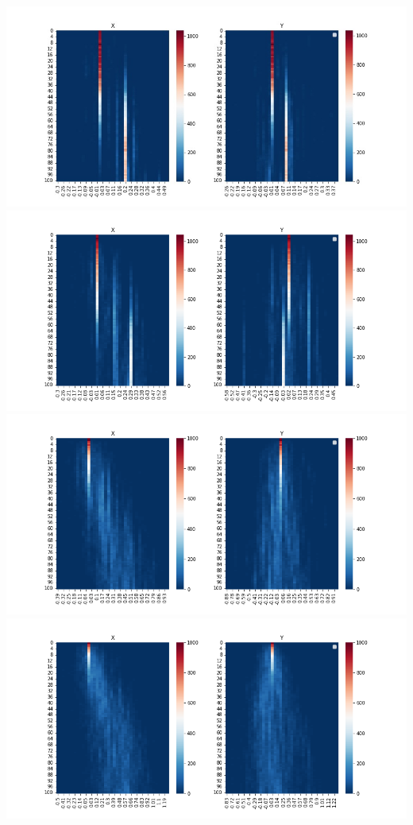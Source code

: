 \documentclass{article}
\begin{document}
\begin{center}
\includegraphics[scale=0.37]{heatmap_mu_0.005}
\includegraphics[scale=0.37]{heatmap_mu_0.01}
\includegraphics[scale=0.37]{heatmap_mu_0.05}
\includegraphics[scale=0.37]{heatmap_mu_0.1}

\end{center}
\end{document}
